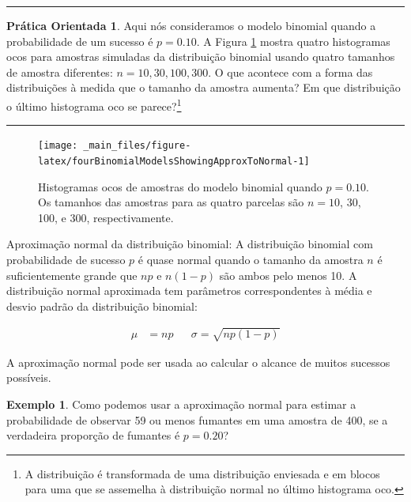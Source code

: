 \documentclass[
]{book}
\theoremstyle{definition}
\theoremstyle{definition}
\newtheorem{example}{Exemplo}[chapter]
\theoremstyle{definition}
\newtheorem{exercise}{Prática Orientada}[chapter]
\theoremstyle{definition}
\theoremstyle{remark}
\begin{document}
\begin{center}\rule{0.5\linewidth}{0.5pt}\end{center}

\begin{exercise}
\protect\hypertarget{exr:unnamed-chunk-138}{}{\label{exr:unnamed-chunk-138} }Aqui nós consideramos o modelo binomial quando a probabilidade de um sucesso é \(p=0.10\). A Figura \ref{fig:fourBinomialModelsShowingApproxToNormal} mostra quatro histogramas ocos para amostras simuladas da distribuição binomial usando quatro tamanhos de amostra diferentes: \(n=10, 30, 100, 300\). O que acontece com a forma das distribuições à medida que o tamanho da amostra aumenta? Em que distribuição o último histograma oco se parece?\footnote{A distribuição é transformada de uma distribuição enviesada e em blocos para uma que se assemelha à distribuição normal no último histograma oco.}
\end{exercise}

\begin{center}\rule{0.5\linewidth}{0.5pt}\end{center}

\begin{figure}

{\centering \texttt{[image: \_main\_files/figure-latex/fourBinomialModelsShowingApproxToNormal-1]} 

}

\caption{Histogramas ocos de amostras do modelo binomial quando $p=0.10$. Os tamanhos das amostras para as quatro parcelas são $n=10$, 30, 100, e 300, respectivamente.}\label{fig:fourBinomialModelsShowingApproxToNormal}
\end{figure}

Aproximação normal da distribuição binomial: A distribuição binomial com probabilidade de sucesso \(p\) é quase normal quando o tamanho da amostra \(n\) é suficientemente grande que \(np\) e \(n(1-p)\) são ambos pelo menos 10. A distribuição normal aproximada tem parâmetros correspondentes à média e desvio padrão da distribuição binomial:

\begin{align*}
\mu &= np
&&\sigma= \sqrt{np(1-p)}
\end{align*}

A aproximação normal pode ser usada ao calcular o alcance de muitos sucessos possíveis.

\begin{example}
\protect\hypertarget{exm:unnamed-chunk-139}{}{\label{exm:unnamed-chunk-139} }Como podemos usar a aproximação normal para estimar a probabilidade de observar 59 ou menos fumantes em uma amostra de 400, se a verdadeira proporção de fumantes é \(p=0.20\)?
\end{example}
\end{document}
